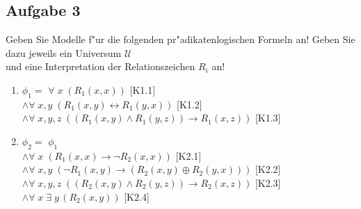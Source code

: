 \documentclass[10pt,oneside,onecolumn,a4paper,german,titlepage]{article}
\begin{document}
\subsection*{Aufgabe 3}
Geben Sie Modelle f"ur die folgenden pr"adikatenlogischen Formeln an! Geben Sie dazu
jeweils ein Universum $\mathcal{U}$\\
und eine Interpretation der Relationszeichen $R_i$ an!
\begin{enumerate}
\item $\phi_1 =$ \hspace*{0.2cm} $\forall \; x \; (R_1(x,x))$ \hspace*{5.3cm}[K1.1]\\
\hspace*{0.85cm} $\wedge \forall \; x,y \; (R_1(x,y) \leftrightarrow R_1(y,x))$
\hspace*{3.2cm} [K1.2]\\
\hspace*{0.85cm} $\wedge \forall \; x,y,z \; ((R_1(x,y) \wedge R_1(y,z)) \rightarrow
R_1(x,z))$ \hspace*{1cm} [K1.3]
\item $\phi_2 =$ \hspace*{0.2cm} $\phi_1$\\
\hspace*{0.85cm} $\wedge \forall \; x \; (R_1(x,x) \rightarrow \neg R_2(x,x))$
\hspace*{3.25cm} [K2.1]\\
\hspace*{0.85cm} $\wedge \forall \; x,y \; (\neg R_1(x,y) \rightarrow (R_2(x,y)
\oplus R_2(y,x)))$ \hspace*{1cm} [K2.2]\\
\hspace*{0.85cm} $\wedge \forall \; x,y,z \; ((R_2(x,y) \wedge R_2(y,z)) \rightarrow
R_2(x,z))$ \hspace*{1cm}  [K2.3]\\
\hspace*{0.85cm} $\wedge \forall \; x \; \exists \; y \, (R_2(x,y))$ \hspace*{4.8cm}
[K2.4]
\end{enumerate}

\newpage
\end{document}

